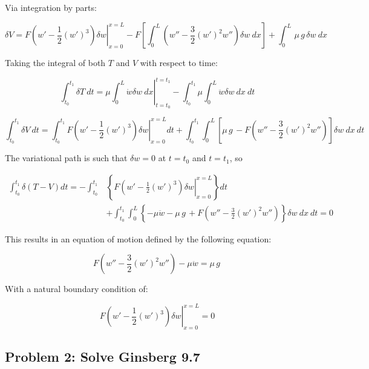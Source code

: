 \documentclass[12pt, letterpaper]{../assignment}
\begin{document}
Via integration by parts:


$$ \delta V = 
\left. F \left( w' - \frac{1}{2}(w')^3 \right)\delta w \right|_{x = 0}^{x = L}
- F \left[ \int_0^L \left( w'' - \frac{3}{2}(w')^2 w'' \right)\delta w\ dx \right] 
+ \int_0^L \,\mu\,g\,\delta w\ dx $$

Taking the integral of both $T$ and $V$ with respect to time:

$$ \int_{t_0}^{t_1} \delta T \ dt =
\left. \mu \int_0^L \dot{w} \delta w\ dx\right|_{t = t_0}^{t = t_1} 
- \int_{t_0}^{t_1}\mu \int_0^L \ddot{w} \delta w\ dx\ dt $$

$$ \int_{t_0}^{t_1} \delta V\ dt = 
\int_{t_0}^{t_1} \left. F \left( w' - \frac{1}{2}(w')^3 \right)\delta w \right|_{x = 0}^{x = L} dt
+ \int_{t_0}^{t_1} \int_0^L \left[ \mu\,g\, -F\left( w'' - \frac{3}{2}(w')^2 w'' \right) \right]\delta w\ dx\ dt $$

The variational path is such that $\delta w = 0$ at $t = t_0$ and $t = t_1$, so

\begin{equation*}
\begin{aligned}
\int_{t_0}^{t_1} \delta \left(T - V\right) dt =
- \int_{t_0}^{t_1} & \left\{\left. F \left( w' - \frac{1}{2}(w')^3 \right)\delta w \right|_{x = 0}^{x = L} \right\} dt \\
&+ \int_{t_0}^{t_1} \int_0^L \left\{ - \mu \ddot{w} -\mu\,g\, +F\left( w'' - \frac{3}{2}(w')^2 w'' \right) \right\}\delta w\ dx\ dt
= 0
\end{aligned}
\end{equation*}

This results in an equation of motion defined by the following equation:

\begin{answer}
$$  F\left( w'' - \frac{3}{2}(w')^2 w'' \right) - \mu \ddot{w} = \mu\,g\, $$
\end{answer}

With a natural boundary condition of:

\begin{answer}
  $$ \left. F \left( w' - \frac{1}{2}(w')^3 \right)\delta w \right|_{x = 0}^{x = L} = 0 $$
\end{answer}

\subsection*{Problem 2: Solve Ginsberg 9.7}
\end{document}
